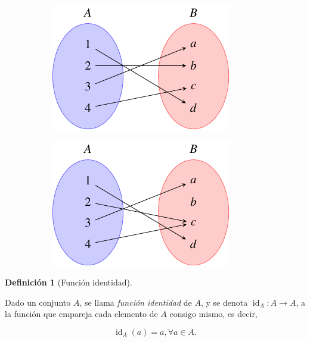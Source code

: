 \documentclass[
  a4paper,
]{scrreport}
\theoremstyle{definition}
\theoremstyle{plain}
\theoremstyle{definition}
\newtheorem{definition}{Definición}[chapter]
\theoremstyle{definition}
\theoremstyle{plain}
\theoremstyle{plain}
\theoremstyle{remark}
\begin{document}
\begin{figure}
\begin{minipage}{0.50\linewidth}
\begin{figure}[H]
{\centering \includegraphics{./img/teoria-conjuntos/funcion-biyectiva.pdf}

}


\end{figure}%

\end{minipage}%
%
\begin{minipage}{0.50\linewidth}

\begin{figure}[H]

{\centering \includegraphics{./img/teoria-conjuntos/funcion-no-inyectiva-no-sobreyectiva.pdf}

}


\end{figure}%

\end{minipage}%

\end{figure}%

\begin{definition}[Función
identidad]\protect\hypertarget{def-funcion-identidad}{}\label{def-funcion-identidad}

Dado un conjunto \(A\), se llama \emph{función identidad} de \(A\), y se
denota \(\operatorname{id}_A:A\rightarrow A\), a la función que empareja
cada elemento de \(A\) consigo mismo, es decir,

\[\operatorname{id}_A (a) = a, \forall a\in A.\]

\end{definition}
\end{document}

